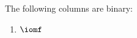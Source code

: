 The following columns are binary:
\begin{multicols}{1}
\begin{enumerate}
	\item $\iomf$
\end{enumerate}
\end{multicols}
